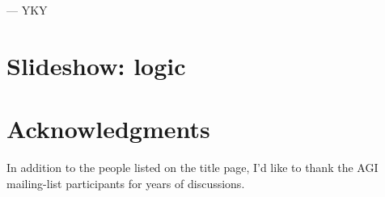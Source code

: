 \documentclass[12pt, a4paper]{report}
\begin{document}
\begin{flushright}
--- YKY
\end{flushright}




\chapter{Slideshow: logic}


















\chapter*{Acknowledgments}

In addition to the people listed on the title page, I'd like to thank the AGI mailing-list participants for years of discussions.


\end{document}
